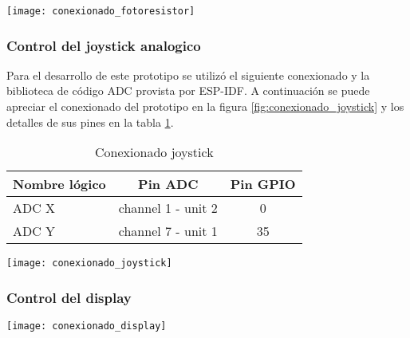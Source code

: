 \vspace{0.5cm}
\begin{center}
  \texttt{[image: conexionado\_fotoresistor]}
    \label{fig:conexionado_fotoresistor}
    
\end{center}

\subsubsection{Control del joystick analogico}
Para el desarrollo de este prototipo se utilizó el siguiente conexionado y la biblioteca de código ADC provista por ESP-IDF. A continuación se puede apreciar el conexionado del prototipo en la figura \ref{fig:conexionado_joystick} y los detalles de sus pines en la tabla \ref{tab:conexionado_joystick}.


\vspace{0.5cm}
\begin{table}[h]
\centering
\caption[Conexionado joystick]{Conexionado joystick}
\begin{tabular}{l c c}
\toprule
\textbf{Nombre lógico} & \textbf{Pin ADC} & \textbf{Pin GPIO}\\
\midrule
ADC X & channel 1 - unit 2 & 0 \\
ADC Y & channel 7 - unit 1 & 35 \\
\bottomrule
\hline
\end{tabular}
\label{tab:conexionado_joystick}
\end{table}

\vspace{0.5cm}

\begin{center}
  \texttt{[image: conexionado\_joystick]}
    \label{fig:conexionado_joystick}
    

\end{center}

\subsubsection{Control del display}
 
\begin{center}
  \texttt{[image: conexionado\_display]}
    \label{fig:conexionado_display}

\end{center}

